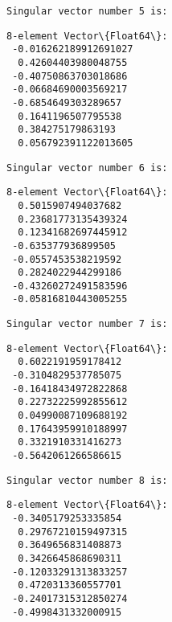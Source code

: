 \documentclass[11pt]{article}
\begin{document}
    
    \begin{Verbatim}[commandchars=\\\{\}]
Singular vector number 5 is:
    \end{Verbatim}

    
    \begin{Verbatim}[commandchars=\\\{\}]
8-element Vector\{Float64\}:
 -0.016262189912691027
  0.42604403980048755
 -0.40750863703018686
 -0.06684690003569217
 -0.6854649303289657
  0.1641196507795538
  0.384275179863193
  0.056792391122013605
    \end{Verbatim}

    
    \begin{Verbatim}[commandchars=\\\{\}]
Singular vector number 6 is:
    \end{Verbatim}

    
    \begin{Verbatim}[commandchars=\\\{\}]
8-element Vector\{Float64\}:
  0.5015907494037682
  0.23681773135439324
  0.12341682697445912
 -0.635377936899505
 -0.0557453538219592
  0.2824022944299186
 -0.43260272491583596
 -0.05816810443005255
    \end{Verbatim}

    
    \begin{Verbatim}[commandchars=\\\{\}]
Singular vector number 7 is:
    \end{Verbatim}

    
    \begin{Verbatim}[commandchars=\\\{\}]
8-element Vector\{Float64\}:
  0.6022191959178412
 -0.3104829537785075
 -0.16418434972822868
  0.22732225992855612
  0.04990087109688192
  0.17643959910188997
  0.3321910331416273
 -0.5642061266586615
    \end{Verbatim}

    
    \begin{Verbatim}[commandchars=\\\{\}]
Singular vector number 8 is:
    \end{Verbatim}

    
    \begin{Verbatim}[commandchars=\\\{\}]
8-element Vector\{Float64\}:
 -0.3405179253335854
  0.29767210159497315
  0.3649656831408873
  0.3426645868690311
 -0.12033291313833257
  0.4720313360557701
 -0.24017315312850274
 -0.4998431332000915
    \end{Verbatim}
\end{document}
